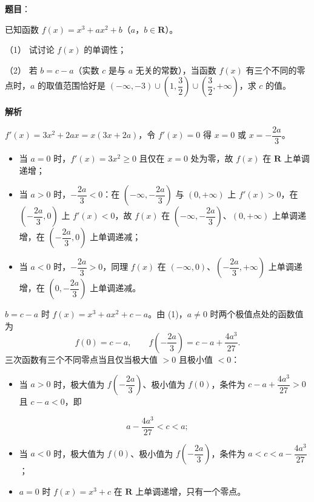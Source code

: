 \begin{answer}

\textbf{题目}：

已知函数 \(f(x)=x^{3}+ax^{2}+b\)（\(a\)，\(b\in\mathbf{R}\)）。

（1） 试讨论 \(f(x)\) 的单调性；

（2） 若 \(b=c-a\)（实数 \(c\) 是与 \(a\) 无关的常数），当函数 \(f(x)\) 有三个不同的零点时，\(a\) 的取值范围恰好是 \((-\infty,-3)\cup\left(1,\dfrac{3}{2}\right)\cup\left(\dfrac{3}{2},+\infty\right)\)，求 \(c\) 的值。

\textbf{解析}


\(f'(x)=3x^{2}+2ax=x(3x+2a)\)，令 \(f'(x)=0\) 得 \(x=0\) 或 \(x=-\dfrac{2a}{3}\)。

\begin{itemize}
\item 当 \(a=0\) 时，\(f'(x)=3x^{2}\geqslant0\) 且仅在 \(x=0\) 处为零，故 \(f(x)\) 在 \(\mathbf{R}\) 上单调递增；
\item 当 \(a>0\) 时，\(-\dfrac{2a}{3}<0\)：在 \(\left(-\infty,-\dfrac{2a}{3}\right)\) 与 \((0,+\infty)\) 上 \(f'(x)>0\)，在 \(\left(-\dfrac{2a}{3},0\right)\) 上 \(f'(x)<0\)，故 \(f(x)\) 在 \(\left(-\infty,-\dfrac{2a}{3}\right)\)、\((0,+\infty)\) 上单调递增，在 \(\left(-\dfrac{2a}{3},0\right)\) 上单调递减；
\item 当 \(a<0\) 时，\(-\dfrac{2a}{3}>0\)，同理 \(f(x)\) 在 \((-\infty,0)\)、\(\left(-\dfrac{2a}{3},+\infty\right)\) 上单调递增，在 \(\left(0,-\dfrac{2a}{3}\right)\) 上单调递减。
\end{itemize}


\(b=c-a\) 时 \(f(x)=x^{3}+ax^{2}+c-a\)。由 (1)，\(a\ne0\) 时两个极值点处的函数值为
\nopagebreak[4]
\[
f(0)=c-a,\qquad f\left(-\frac{2a}{3}\right)=c-a+\frac{4a^{3}}{27}.
\]
三次函数有三个不同零点当且仅当极大值 \(>0\) 且极小值 \(<0\)：

\begin{itemize}
\item 当 \(a>0\) 时，极大值为 \(f\left(-\dfrac{2a}{3}\right)\)、极小值为 \(f(0)\)，条件为 \(c-a+\dfrac{4a^{3}}{27}>0\) 且 \(c-a<0\)，即
\end{itemize}
\nopagebreak[4]
\[
a-\frac{4a^{3}}{27}<c<a; \tag{1}
\]
\begin{itemize}
\item 当 \(a<0\) 时，极大值为 \(f(0)\)、极小值为 \(f\left(-\dfrac{2a}{3}\right)\)，条件为 \(a<c<a-\dfrac{4a^{3}}{27}\)；
\item \(a=0\) 时 \(f(x)=x^{3}+c\) 在 \(\mathbf{R}\) 上单调递增，只有一个零点。
\end{itemize}


\end{answer}

